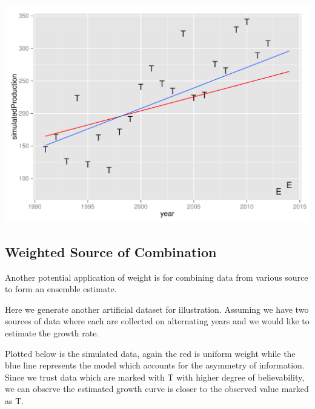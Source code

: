 \documentclass[nojss]{jss}\usepackage[]{graphicx}\usepackage[]{color}
\makeatletter
\def\maxwidth{ %
  \ifdim\Gin@nat@width>\linewidth
    \linewidth
  \else
    \Gin@nat@width
  \fi
}
\newenvironment{knitrout}{}{} %
\makeatother
\begin{document}
\begin{knitrout}
{\centering \includegraphics[width=\maxwidth]{figure/simulated-example} 

}



\end{knitrout}


\subsection{Weighted Source of Combination}

Another potential application of weight is for combining data from
various source to form an ensemble estimate.

Here we generate another artificial dataset for illustration. Assuming
we have two sources of data where each are collected on alternating
years and we would like to estimate the growth rate.

Plotted below is the simulated data, again the red is uniform weight
while the blue line represents the model which accounts for the
asymmetry of information. Since we trust data which are marked with T
with higher degree of believability, we can observe the estimated
growth curve is closer to the observed value marked as T.
\end{document}
